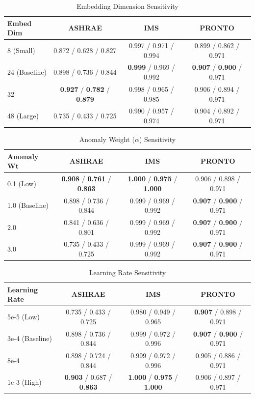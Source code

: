 \begin{table}[t]
\centering
\scriptsize
\caption{Embedding Dimension Sensitivity}
\label{tab:embed_sensitivity}
\begin{tabular}{l|ccc}
\toprule
\textbf{Embed Dim} & \textbf{ASHRAE} & \textbf{IMS} & \textbf{PRONTO} \\
\midrule
8 (Small) & 0.872 / 0.628 / 0.827 & 0.997 / 0.971 / 0.994 & 0.899 / 0.862 / 0.971 \\
24 (Baseline) & 0.898 / 0.736 / 0.844 & \textbf{0.999} / 0.969 / 0.992 & \textbf{0.907} / \textbf{0.900} / 0.971 \\
32 & \textbf{0.927} / \textbf{0.782} / \textbf{0.879} & 0.998 / 0.965 / 0.985 & 0.906 / 0.894 / 0.971 \\
48 (Large) & 0.735 / 0.433 / 0.725 & 0.990 / 0.957 / 0.974 & 0.904 / 0.892 / 0.971 \\
\bottomrule
\end{tabular}
\end{table}

\begin{table}[t]
\centering
\scriptsize
\caption{Anomaly Weight ($\alpha$) Sensitivity}
\label{tab:anomaly_sensitivity}
\begin{tabular}{l|ccc}
\toprule
\textbf{Anomaly Wt} & \textbf{ASHRAE} & \textbf{IMS} & \textbf{PRONTO} \\
\midrule
0.1 (Low) & \textbf{0.908} / \textbf{0.761} / \textbf{0.863} & \textbf{1.000} / \textbf{0.975} / \textbf{1.000} & 0.906 / 0.898 / 0.971 \\
1.0 (Baseline) & 0.898 / 0.736 / 0.844 & 0.999 / 0.969 / 0.992 & \textbf{0.907} / \textbf{0.900} / 0.971 \\
2.0 & 0.841 / 0.636 / 0.801 & 0.999 / 0.969 / 0.992 & \textbf{0.907} / \textbf{0.900} / 0.971 \\
3.0 & 0.735 / 0.433 / 0.725 & 0.999 / 0.969 / 0.992 & \textbf{0.907} / \textbf{0.900} / 0.971 \\
\bottomrule
\end{tabular}
\end{table}

\begin{table}[t]
\centering
\scriptsize
\caption{Learning Rate Sensitivity}
\label{tab:lr_sensitivity}
\begin{tabular}{l|ccc}
\toprule
\textbf{Learning Rate} & \textbf{ASHRAE} & \textbf{IMS} & \textbf{PRONTO} \\
\midrule
5e-5 (Low) & 0.735 / 0.433 / 0.725 & 0.980 / 0.949 / 0.965 & \textbf{0.907} / 0.898 / 0.971 \\
3e-4 (Baseline) & 0.898 / 0.736 / 0.844 & 0.999 / 0.972 / 0.996 & \textbf{0.907} / \textbf{0.900} / 0.971 \\
8e-4 & 0.898 / 0.724 / 0.844 & 0.999 / 0.972 / 0.996 & 0.905 / 0.886 / 0.971 \\
1e-3 (High) & \textbf{0.903} / 0.687 / \textbf{0.863} & \textbf{1.000} / \textbf{0.975} / \textbf{1.000} & 0.906 / 0.897 / 0.971 \\
\bottomrule
\end{tabular}
\end{table}
